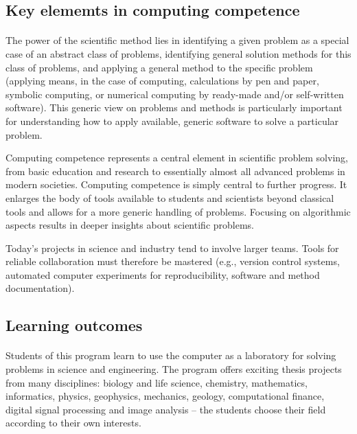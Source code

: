\documentclass[%
oneside,                 %
final,                   %
10pt]{article}
\begin{document}
\noindent



\subsection*{Key elememts in computing competence}

\paragraph{}
The power of the scientific method lies in identifying a given problem
as a special case of an abstract class of problems, identifying
general solution methods for this class of problems, and applying a
general method to the specific problem (applying means, in the case of
computing, calculations by pen and paper, symbolic computing, or
numerical computing by ready-made and/or self-written software). This
generic view on problems and methods is particularly important for
understanding how to apply available, generic software to solve a
particular problem.  


Computing competence represents a central element
in scientific problem solving, from basic education and research to
essentially almost all advanced problems in modern
societies. Computing competence is simply central to further
progress. It enlarges the body of tools available to students and
scientists beyond classical tools and allows for a more generic
handling of problems. Focusing on algorithmic aspects results in
deeper insights about scientific problems.

Today's projects in science and industry tend to involve larger teams. Tools for reliable collaboration must therefore be mastered (e.g., version control systems, automated computer experiments for reproducibility, software and method documentation).




\subsection*{Learning outcomes}

\paragraph{}
Students of this program learn to use the computer as a laboratory for solving problems in science and engineering. The program offers exciting thesis projects from many disciplines: biology and life science, chemistry, mathematics, informatics, physics, geophysics, mechanics, geology, computational finance, digital signal processing and image analysis  – the students choose their  field according to their own interests. 
\end{document}
